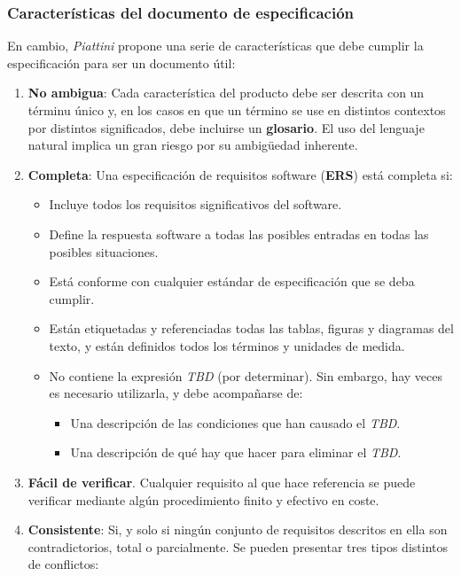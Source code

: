 \subsubsection{Características del documento de especificación}

En cambio, \textit{Piattini} propone una serie de características que debe cumplir la especificación para ser un documento útil:

\begin{enumerate}
    \item \textbf{No ambigua}: Cada característica del producto debe ser descrita con un términu único y, en los casos en que un término se use en distintos contextos por distintos significados, debe incluirse un \textbf{glosario}. El uso del lenguaje natural implica un gran riesgo por su ambigüedad inherente.
    \item \textbf{Completa}: Una especificación de requisitos software (\textbf{ERS}) está completa si:
          \begin{itemize}
              \item Incluye todos los requisitos significativos del software.
              \item Define la respuesta software a todas las posibles entradas en todas las posibles situaciones.
              \item Está conforme con cualquier estándar de especificación que se deba cumplir.
              \item Están etiquetadas y referenciadas todas las tablas, figuras y diagramas del texto, y están definidos todos los términos y unidades de medida.
              \item No contiene la expresión \textit{TBD} (por determinar). Sin embargo, hay veces es necesario utilizarla, y debe acompañarse de:
                    \begin{itemize}
                        \item Una descripción de las condiciones que han causado el \textit{TBD}.
                        \item Una descripción de qué hay que hacer para eliminar el \textit{TBD}.
                    \end{itemize}
          \end{itemize}
    \item \textbf{Fácil de verificar}. Cualquier requisito al que hace referencia se puede verificar mediante algún procedimiento finito y efectivo en coste.
    \item \textbf{Consistente}: Si, y solo si ningún conjunto de requisitos descritos en ella son contradictorios, total o parcialmente. Se pueden presentar tres tipos distintos de conflictos:

\end{enumerate}
